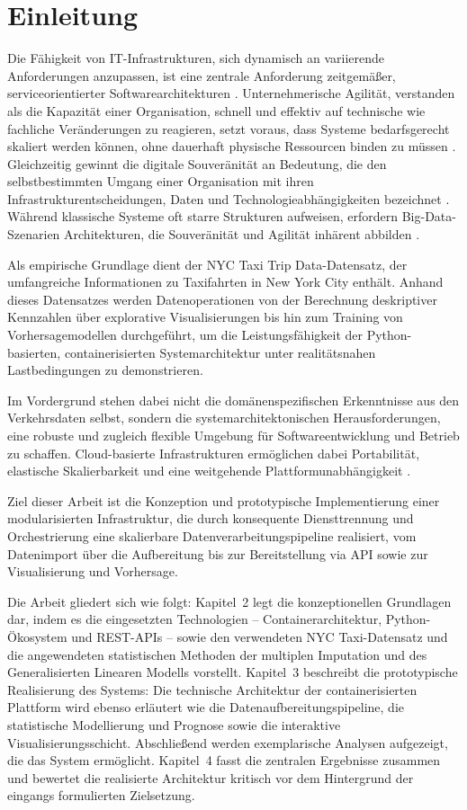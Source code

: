\chapter{Einleitung}
\sloppy
Die Fähigkeit von IT-Infrastrukturen, sich dynamisch an variierende Anforderungen anzupassen, ist eine zentrale Anforderung zeitgemäßer, serviceorientierter Softwarearchitekturen \parencite[vgl.][S.~195~ff.]{Dragoni.2017}. Unternehmerische Agilität, verstanden als die Kapazität einer Organisation, schnell und effektiv auf technische wie fachliche Veränderungen zu reagieren, setzt voraus, dass Systeme bedarfsgerecht skaliert werden können, ohne dauerhaft physische Ressourcen binden zu müssen \parencite[vgl.][S.~4~ff.]{Urbach.2016}. Gleichzeitig gewinnt die digitale Souveränität an Bedeutung, die den selbstbestimmten Umgang einer Organisation mit ihren Infrastrukturentscheidungen, Daten und Technologieabhängigkeiten bezeichnet \parencite[vgl.][S.~8~ff.]{Kagermann.2021}. Während klassische Systeme oft starre Strukturen aufweisen, erfordern Big-Data-Szenarien Architekturen, die Souveränität und Agilität inhärent abbilden \parencite[vgl.][S.~3~ff.]{Fasel.2016}.

Als empirische Grundlage dient der NYC Taxi Trip Data-Datensatz, der umfangreiche Informationen zu Taxifahrten in New York City enthält. Anhand dieses Datensatzes werden Datenoperationen von der Berechnung deskriptiver Kennzahlen über explorative Visualisierungen bis hin zum Training von Vorhersagemodellen durchgeführt, um die Leistungsfähigkeit der Python-basierten, containerisierten Systemarchitektur unter realitätsnahen Lastbedingungen zu demonstrieren. 

Im Vordergrund stehen dabei nicht die domänenspezifischen Erkenntnisse aus den Verkehrsdaten selbst, sondern die systemarchitektonischen Herausforderungen, eine robuste und zugleich flexible Umgebung für Softwareentwicklung und Betrieb zu schaffen. Cloud-basierte Infrastrukturen ermöglichen dabei Portabilität, elastische Skalierbarkeit und eine weitgehende Plattformunabhängigkeit \parencite[vgl.][S.~2--3]{NIST.2011}.

Ziel dieser Arbeit ist die Konzeption und prototypische Implementierung einer modularisierten Infrastruktur, die durch konsequente Diensttrennung und Orchestrierung eine skalierbare Datenverarbeitungspipeline realisiert, vom Datenimport über die Aufbereitung bis zur Bereitstellung via API sowie zur Visualisierung und Vorhersage.

Die Arbeit gliedert sich wie folgt: Kapitel~2 legt die konzeptionellen Grundlagen dar, indem es die eingesetzten Technologien -- Containerarchitektur, Python-Ökosystem und REST-APIs -- sowie den verwendeten NYC Taxi-Datensatz und die angewendeten statistischen Methoden der multiplen Imputation und des Generalisierten Linearen Modells vorstellt. Kapitel~3 beschreibt die prototypische Realisierung des Systems: Die technische Architektur der containerisierten Plattform wird ebenso erläutert wie die Datenaufbereitungspipeline, die statistische Modellierung und Prognose sowie die interaktive Visualisierungsschicht. Abschließend werden exemplarische Analysen aufgezeigt, die das System ermöglicht. Kapitel~4 fasst die zentralen Ergebnisse zusammen und bewertet die realisierte Architektur kritisch vor dem Hintergrund der eingangs formulierten Zielsetzung.